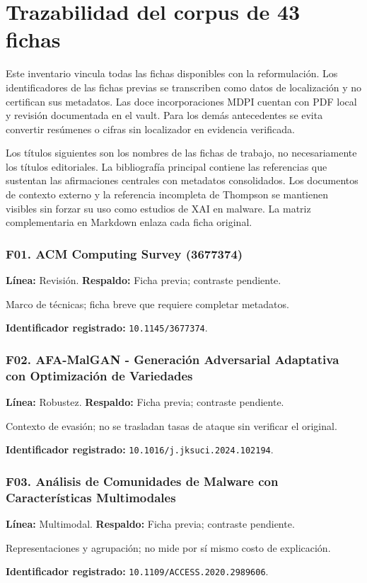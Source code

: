 \chapter{Trazabilidad del corpus de 43 fichas}
\label{app:corpus}
Este inventario vincula todas las fichas disponibles con la reformulación. Los identificadores de las fichas previas se transcriben como datos de localización y no certifican sus metadatos. Las doce incorporaciones MDPI cuentan con PDF local y revisión documentada en el vault. Para los demás antecedentes se evita convertir resúmenes o cifras sin localizador en evidencia verificada.

Los títulos siguientes son los nombres de las fichas de trabajo, no necesariamente los títulos editoriales. La bibliografía principal contiene las referencias que sustentan las afirmaciones centrales con metadatos consolidados. Los documentos de contexto externo y la referencia incompleta de Thompson se mantienen visibles sin forzar su uso como estudios de XAI en malware. La matriz complementaria en Markdown enlaza cada ficha original.
\small
\begin{samepage}
\subsection*{F01. ACM Computing Survey (3677374)}
\noindent\textbf{Línea:} Revisión. \textbf{Respaldo:} Ficha previa; contraste pendiente. 

Marco de técnicas; ficha breve que requiere completar metadatos.

\noindent\textbf{Identificador registrado:} \nolinkurl{10.1145/3677374}.

\end{samepage}
\begin{samepage}
\subsection*{F02. AFA-MalGAN - Generación Adversarial Adaptativa con Optimización de Variedades}
\noindent\textbf{Línea:} Robustez. \textbf{Respaldo:} Ficha previa; contraste pendiente. 

Contexto de evasión; no se trasladan tasas de ataque sin verificar el original.

\noindent\textbf{Identificador registrado:} \nolinkurl{10.1016/j.jksuci.2024.102194}.

\end{samepage}
\begin{samepage}
\subsection*{F03. Análisis de Comunidades de Malware con Características Multimodales}
\noindent\textbf{Línea:} Multimodal. \textbf{Respaldo:} Ficha previa; contraste pendiente. 

Representaciones y agrupación; no mide por sí mismo costo de explicación.

\noindent\textbf{Identificador registrado:} \nolinkurl{10.1109/ACCESS.2020.2989606}.

\end{samepage}
